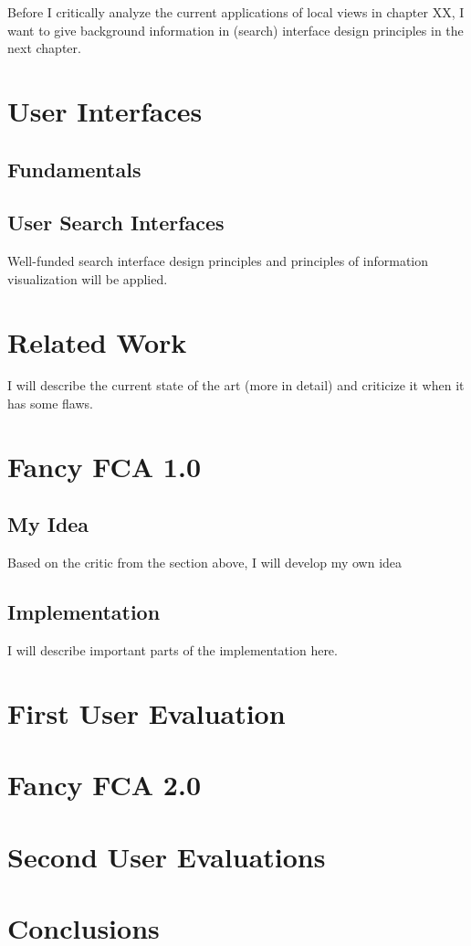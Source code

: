 \documentclass[11pt]{report}
\begin{document}
Before I critically analyze the current applications of local views in chapter XX, I want to give background information in (search) interface design principles in the next chapter.

\chapter{User Interfaces}

\section{Fundamentals}

\blindtext

\section{User Search Interfaces}

Well-funded search interface design principles and principles of information visualization will be applied.\cite{Hearst2009,Shneiderman1996} \\

\blindtext

\chapter{Related Work}

I will describe the current state of the art (more in detail) and criticize it when it has some flaws.

\chapter{Fancy FCA 1.0}

\section{My Idea}

Based on the critic from the section above, I will develop my own idea

\section{Implementation}

I will describe important parts of the implementation here.

\chapter{First User Evaluation}

\blindtext

\chapter{Fancy FCA 2.0}

\chapter{Second User Evaluations}

\blindtext

\chapter{Conclusions}

\blindtext

\newpage



\end{document}
